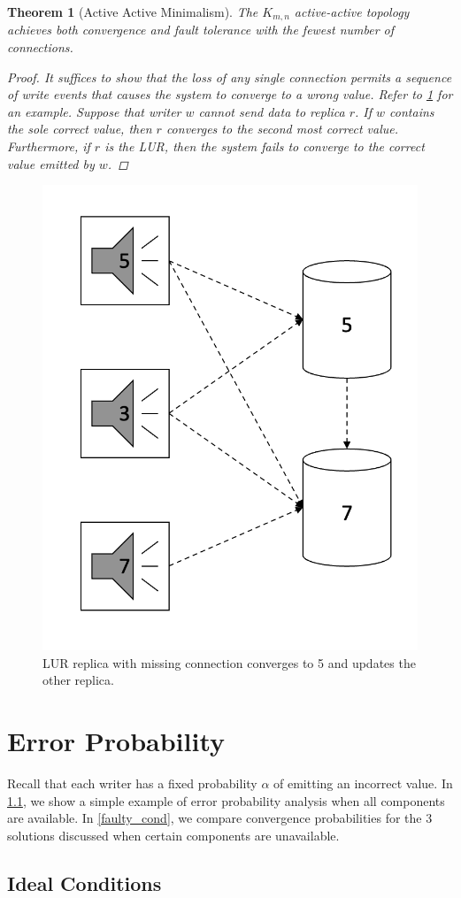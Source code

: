 \documentclass[12pt]{article}
\newtheorem{theorem}{Theorem}%
\begin{document}
\begin{theorem}[Active Active Minimalism] \label{act_act_minimal}
	The \(K_{m, n}\) active-active topology achieves both convergence and fault tolerance with the fewest number of connections.
	\begin{proof}
		It suffices to show that the loss of any single connection permits a sequence of write events that causes the system to converge to a wrong value. Refer to \cref{minimal_img} for an example. Suppose that writer \(w\) cannot send data to replica \(r\). If \(w\) contains the sole correct value, then \(r\) converges to the second most correct value. Furthermore, if \(r\) is the LUR, then the system fails to converge to the correct value emitted by \(w\).
	\end{proof}
\end{theorem}

\begin{figure}[htbp]
	\centering
	\includegraphics[width=.45\textwidth]{minimal.png}
	\caption{LUR replica with missing connection converges to 5 and updates the other replica.}
	\label{minimal_img}
\end{figure}

\section{Error Probability}

Recall that each writer has a fixed probability \(\alpha\) of emitting an incorrect value. In \cref{ideal_cond}, we show a simple example of error probability analysis when all components are available. In \cref{faulty_cond}, we compare convergence probabilities for the 3 solutions discussed when certain components are unavailable.

\subsection{Ideal Conditions} \label{ideal_cond}
\end{document}
